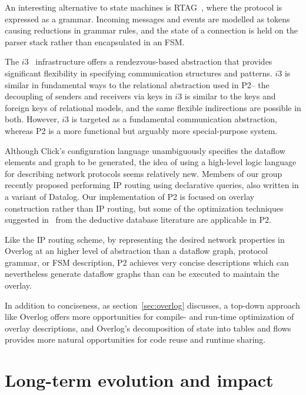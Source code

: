 \documentclass[twocolumn,10pt]{article}
\def\Sys{P2\xspace}
\def\Lang{Overlog\xspace}
\begin{document}
An interesting alternative to state machines is
RTAG~\cite{anderson88rtag}, 
where the protocol is expressed as a grammar.  Incoming messages and
events are modelled as tokens causing reductions in grammar rules, and
the state of a connection is held on the parser stack rather than
encapsulated in an FSM.  

The $i3$~\cite{i3} infrastructure offers a rendezvous-based
abstraction that provides significant flexibility in specifying
communication structures and patterns.  $i3$ is similar in fundamental
ways to the relational abstraction used in \Sys -- the decoupling of
senders and receivers via keys in $i3$ is similar to the keys and
foreign keys of relational models, and the same flexible indirections
are possible in both.  However, $i3$ is targeted as a fundamental
communication abstraction, whereas \Sys is a more functional but
arguably more special-purpose system.

Although Click's configuration language unambiguously specifies the
dataflow elements and graph to be generated, the idea of using a
high-level logic language for describing network protocols seems
relatively new.  Members of our group~\cite{loo-hotnets04} recently
proposed performing IP routing using declarative queries, also written
in a variant of Datalog.  Our implementation of \Sys is focused on
overlay construction rather than IP routing, but some of the
optimization techniques suggested in~\cite{loo-hotnets04} from the
deductive database literature are applicable in \Sys.  

Like the IP routing scheme, by representing the desired network
properties in \Lang at an higher level of abstraction than a dataflow
graph, protocol grammar, or FSM description, \Sys achieves very
concise descriptions which can nevertheless generate dataflow graphs
than can be executed to maintain the overlay. 

In addition to conciseness, as section~\ref{sec:overlog} discusses, a
top-down approach like \Lang offers more opportunities for compile- and
run-time optimization of overlay descriptions, and \Lang's
decomposition of state into tables and flows provides more natural
opportunities for code reuse and runtime sharing.  

\section{Long-term evolution and impact}
\label{sec:exits}
\end{document}
